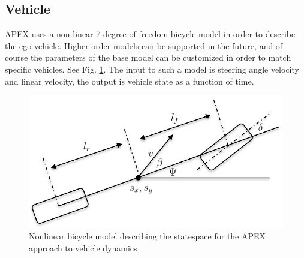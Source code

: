 \documentclass{easychair}
\theoremstyle{theorem}
\theoremstyle{remark}
\begin{document}
\subsection{Vehicle}
APEX uses a non-linear 7 degree of freedom bicycle model \cite{Rajamani2011} in order to describe the ego-vehicle. 
Higher order models can be supported in the future, and of course the parameters of the base model can be customized in order to match specific vehicles. 
See Fig. \ref{fig:bike}. 
The input to such a model is steering angle velocity and linear velocity, the output is vehicle state as a function of time. 

\begin{figure}[b]
	\centering
	\includegraphics[scale=.5]{figures/bicycle_model}
	\caption{Nonlinear bicycle model describing the statespace for the APEX approach to vehicle dynamics}
	\label{fig:bike}
\end{figure}
\end{document}

